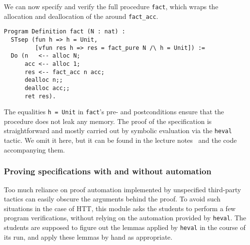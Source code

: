 \documentclass[blockstyle,preprint]{sigplanconf}
\newcommand{\code}[1]{\lstinline{#1}}
\begin{document}
We can now specify and verify the full procedure \code{fact}, which
wraps the allocation and deallocation of the around \code{fact_acc}. 


\begin{lstlisting}
Program Definition fact (N : nat) : 
  STsep (fun h => h = Unit, 
         [vfun res h => res = fact_pure N /\ h = Unit]) := 
  Do (n   <-- alloc N;
      acc <-- alloc 1;
      res <-- fact_acc n acc;
      dealloc n;;
      dealloc acc;;
      ret res).
\end{lstlisting}
%
The equalities \code{h = Unit} in \code{fact}'s pre- and
postconditions ensure that the procedure does not leak any memory. The
proof of the specification is straightforward and mostly carried out
by symbolic evaluation via the \code{heval} tactic. We omit it here,
but it can be found in the lecture notes~\cite{Sergey:PnP} and the
code accompanying them.

\subsubsection{Proving specifications with and without automation}
\label{sec:proving-with-without}

Too much reliance on proof automation implemented by unspecified
third-party tactics can easily obscure the arguments behind the
proof. To avoid such situations in the case of HTT, this module asks
the students to perform a few program verifications, without relying
on the automation provided by \code{heval}. The students are supposed
to figure out the lemmas applied by \code{heval} in the course of its
run, and apply these lemmas by hand as appropriate.
\end{document}
